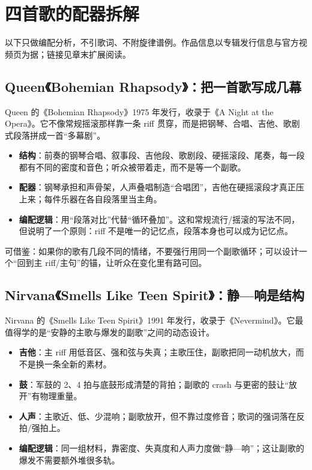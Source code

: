 \section{四首歌的配器拆解}
\label{sec:rock-cases}

以下只做编配分析，不引歌词、不附旋律谱例。作品信息以专辑发行信息与官方视频页为据；链接见章末扩展阅读。

\subsection{Queen《Bohemian Rhapsody》：把一首歌写成几幕}
\label{sec:rock-case-bohemian}

Queen 的《Bohemian Rhapsody》1975 年发行，收录于《A Night at the Opera》。它不像常规摇滚那样靠一条 riff 贯穿，而是把钢琴、合唱、吉他、歌剧式段落拼成一首“多幕剧”。

\begin{itemize}
\item \textbf{结构}：前奏的钢琴合唱、叙事段、吉他段、歌剧段、硬摇滚段、尾奏，每一段都有不同的密度和音色；听众被带着走，而不是等一个副歌。
\item \textbf{配器}：钢琴承担和声骨架，人声叠唱制造“合唱团”，吉他在硬摇滚段才真正压上来；每件乐器在各自段落里当主角。
\item \textbf{编配逻辑}：用“段落对比”代替“循环叠加”。这和常规流行/摇滚的写法不同，但说明了一个原则：riff 不是唯一的记忆点，段落本身也可以成为记忆点。
\end{itemize}

可借鉴：如果你的歌有几段不同的情绪，不要强行用同一个副歌循环；可以设计一个“回到主 riff/主句”的锚，让听众在变化里有路可回。

\subsection{Nirvana《Smells Like Teen Spirit》：静—响是结构}
\label{sec:rock-case-teen-spirit}

Nirvana 的《Smells Like Teen Spirit》1991 年发行，收录于《Nevermind》。它最值得学的是“安静的主歌与爆发的副歌”之间的动态设计。

\begin{itemize}
\item \textbf{吉他}：主 riff 用低音区、强和弦与失真；主歌压住，副歌把同一动机放大，而不是换一条全新的素材。
\item \textbf{鼓}：军鼓的 2、4 拍与底鼓形成清楚的背拍；副歌的 crash 与更密的鼓让“放开”有物理重量。
\item \textbf{人声}：主歌近、低、少混响；副歌放开，但不靠过度修音；歌词的强词落在反拍/强拍上。
\item \textbf{编配逻辑}：同一组材料，靠密度、失真度和人声力度做“静—响”；这让副歌的爆发不需要额外堆很多轨。
\end{itemize}

